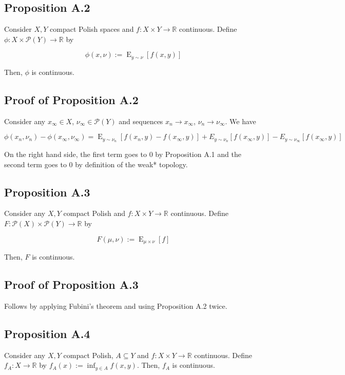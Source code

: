 \documentclass[a4paper]{article}
\DeclareMathOperator{\E}{E}
\newcommand{\Reals}{\mathbb{R}}
\newcommand{\Prob}{\mathcal{P}}
\begin{document}
\subsection{Proposition A.2}

Consider ${X,Y}$ compact Polish spaces and ${f: X \times Y \rightarrow \Reals}$ continuous. Define ${\phi: X \times \Prob(Y) \rightarrow \Reals}$ by 

$${\phi(x,\nu):=\E_{y \sim \nu}[f(x,y)]}$$ 

Then, ${\phi}$ is continuous.

\subsection{Proof of Proposition A.2}

Consider any ${x_\infty \in X}$, ${\nu_\infty \in \Prob(Y)}$ and sequences ${x_n \rightarrow x_\infty}$, ${\nu_n \rightarrow \nu_\infty}$. We have

$$\phi(x_n,\nu_n)- \phi(x_\infty,\nu_\infty)=\E_{y \sim \nu_n}[f(x_n,y)-f(x_\infty,y)]+E_{y \sim \nu_n}[f(x_\infty,y)]-E_{y \sim \nu_\infty}[f(x_\infty,y)]$$

On the right hand side, the first term goes to 0 by Proposition A.1 and the second term goes to 0 by definition of the weak* topology.

\subsection{Proposition A.3}

Consider any ${X,Y}$ compact Polish and ${f: X \times Y \rightarrow \Reals}$ continuous. Define ${F: \Prob(X) \times \Prob(Y) \rightarrow \Reals}$ by 

$${F(\mu,\nu):=\E_{\mu \times \nu}[f]}$$ 

Then, ${F}$ is continuous.

\subsection{Proof of Proposition A.3}

Follows by applying Fubini's theorem and using Proposition A.2 twice.

\subsection{Proposition A.4}

Consider any ${X,Y}$ compact Polish, ${A \subseteq Y}$ and ${f: X \times Y \rightarrow \Reals}$ continuous. Define ${f_A: X \rightarrow \Reals}$ by ${f_A(x):= \inf_{y \in A} f(x,y)}$. Then, ${f_A}$ is continuous.
\end{document}
